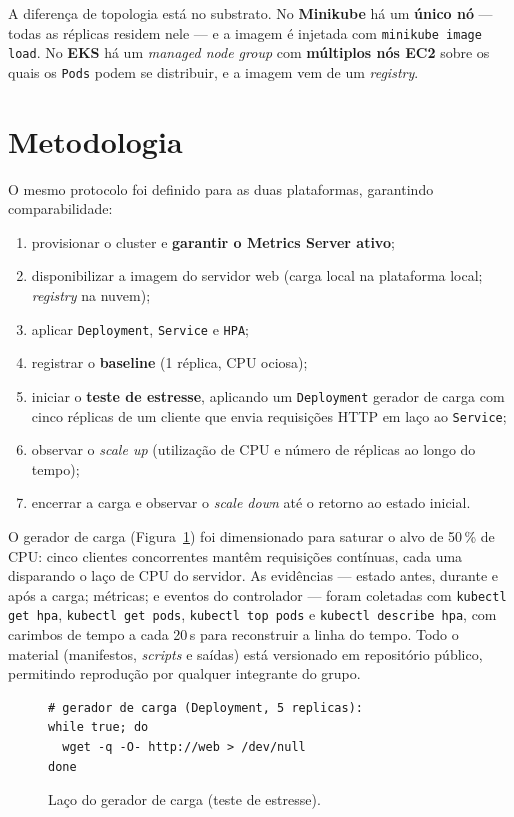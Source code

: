 \documentclass[conference]{IEEEtran}
\begin{document}
A diferença de topologia está no substrato. No \textbf{Minikube} há um \textbf{único nó} --- todas
as réplicas residem nele --- e a imagem é injetada com \texttt{minikube image load}. No
\textbf{EKS} há um \textit{managed node group} com \textbf{múltiplos nós EC2} sobre os quais os
\texttt{Pods} podem se distribuir, e a imagem vem de um \textit{registry}.

\section{Metodologia}\label{sec:met}
O mesmo protocolo foi definido para as duas plataformas, garantindo comparabilidade:
\begin{enumerate}
\item provisionar o cluster e \textbf{garantir o Metrics Server ativo};
\item disponibilizar a imagem do servidor web (carga local na plataforma local; \textit{registry}
na nuvem);
\item aplicar \texttt{Deployment}, \texttt{Service} e \texttt{HPA};
\item registrar o \textbf{baseline} (1 réplica, CPU ociosa);
\item iniciar o \textbf{teste de estresse}, aplicando um \texttt{Deployment} gerador de carga com
cinco réplicas de um cliente que envia requisições HTTP em laço ao \texttt{Service};
\item observar o \textit{scale up} (utilização de CPU e número de réplicas ao longo do tempo);
\item encerrar a carga e observar o \textit{scale down} até o retorno ao estado inicial.
\end{enumerate}

O gerador de carga (Figura~\ref{fig:load}) foi dimensionado para saturar o alvo de 50\,\% de CPU:
cinco clientes concorrentes mantêm requisições contínuas, cada uma disparando o laço de CPU do
servidor. As evidências --- estado antes, durante e após a carga; métricas; e eventos do
controlador --- foram coletadas com \texttt{kubectl get hpa}, \texttt{kubectl get pods},
\texttt{kubectl top pods} e \texttt{kubectl describe hpa}, com carimbos de tempo a cada 20\,s para
reconstruir a linha do tempo. Todo o material (manifestos, \textit{scripts} e saídas) está
versionado em repositório público, permitindo reprodução por qualquer integrante do grupo.

\begin{figure}[!t]
\footnotesize
\begin{verbatim}
# gerador de carga (Deployment, 5 replicas):
while true; do
  wget -q -O- http://web > /dev/null
done
\end{verbatim}
\caption{Laço do gerador de carga (teste de estresse).}
\label{fig:load}
\end{figure}
\end{document}
